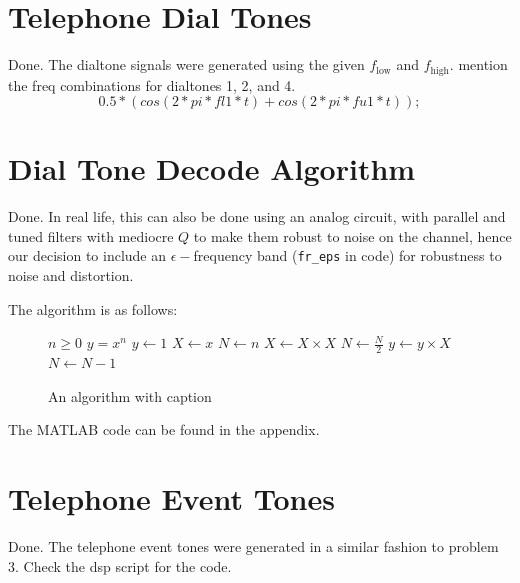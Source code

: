 \documentclass[10pt]{article}
\begin{document}
\section{Telephone Dial Tones}
Done. The dialtone signals were generated using the given $f_\text{low}$ and $f_\text{high}$. mention the freq combinations for dialtones 1, 2, and 4.
\[
    0.5*(cos(2*pi*fl1*t) + cos(2*pi*fu1*t));
\]

\section{Dial Tone Decode Algorithm}
Done. In real life, this can also be done using an analog circuit, with parallel and tuned filters with mediocre $Q$ to make them robust to noise on the channel, hence our decision to include an $\epsilon -$frequency band (\texttt{fr\_eps} in code) for robustness to noise and distortion.

The algorithm is as follows:
\begin{figure}[ht]
  \centering
  \begin{minipage}{.5\linewidth}
        \begin{algorithm}[H]
            \caption{An algorithm with caption}\label{alg:cap}
            \begin{algorithmic}
                \Require $n \geq 0$
                \Ensure $y = x^n$
                \State $y \gets 1$
                \State $X \gets x$
                \State $N \gets n$
                    \State $X \gets X \times X$
                    \State $N \gets \frac{N}{2}$  
                    \State $y \gets y \times X$
                    \State $N \gets N - 1$
                \EndIf
                \EndWhile
            \end{algorithmic}
        \end{algorithm}
    \end{minipage}
\end{figure}

The \textsc{MATLAB} code can be found in the appendix.

\section{Telephone Event Tones}
Done. The telephone event tones were generated in a similar fashion to problem 3. Check the dsp script for the code.
\end{document}
